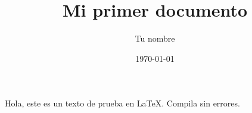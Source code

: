 \documentclass{article}
\title{Mi primer documento}
\author{Tu nombre}
\date{\today}
\begin{document}
Hola, este es un texto de prueba en \LaTeX. Compila sin errores.
\end{document}
